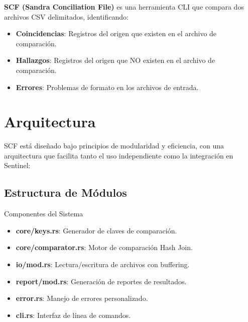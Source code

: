 \begin{definicion}
\textbf{SCF (Sandra Conciliation File)} es una herramienta CLI que compara dos archivos CSV delimitados, identificando:
\begin{itemize}
\item \textbf{Coincidencias}: Registros del origen que existen en el archivo de comparación.
\item \textbf{Hallazgos}: Registros del origen que NO existen en el archivo de comparación.
\item \textbf{Errores}: Problemas de formato en los archivos de entrada.
\end{itemize}
\end{definicion}


\section{Arquitectura}

SCF está diseñado bajo principios de modularidad y eficiencia, con una arquitectura que facilita tanto el uso independiente como la integración en Sentinel:

\subsection{Estructura de Módulos}

\begin{caja}{Componentes del Sistema}
\begin{itemize}
\item \textbf{core/keys.rs}: Generador de claves de comparación.
\item \textbf{core/comparator.rs}: Motor de comparación Hash Join.
\item \textbf{io/mod.rs}: Lectura/escritura de archivos con buffering.
\item \textbf{report/mod.rs}: Generación de reportes de resultados.
\item \textbf{error.rs}: Manejo de errores personalizado.
\item \textbf{cli.rs}: Interfaz de línea de comandos.
\end{itemize}
\end{caja}


